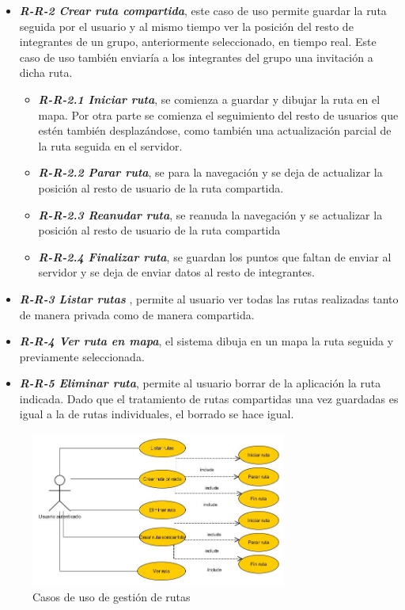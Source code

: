 \begin{itemize}
\begin{itemize}
\item \textbf{\textit{R-R-2 Crear ruta compartida}}, este caso de uso permite guardar la ruta seguida por el usuario y al mismo tiempo ver la posición del resto de integrantes de un grupo, anteriormente seleccionado, en tiempo real. Este caso de uso también enviaría a los integrantes del grupo una invitación a dicha ruta.
\begin{itemize}
\item \textbf{\textit{R-R-2.1 Iniciar ruta}}, se comienza a guardar y dibujar la ruta en el mapa. Por otra parte se comienza el seguimiento del resto de usuarios que estén también desplazándose, como también una actualización parcial de la ruta seguida en el servidor.
\item \textbf{\textit{R-R-2.2 Parar ruta}}, se para la navegación y se deja de actualizar la posición al resto de usuario de la ruta compartida.
\item \textbf{\textit{R-R-2.3 Reanudar ruta}}, se reanuda la navegación y se  actualizar la posición al resto de usuario de la ruta compartida
\item \textbf{\textit{R-R-2.4 Finalizar ruta}}, se guardan los puntos que faltan de enviar al servidor y se deja de enviar datos al resto de integrantes.
\end{itemize}
\item \textbf{\textit{R-R-3 Listar rutas} }, permite al usuario ver todas las rutas realizadas tanto de manera privada como de manera compartida.
\item \textbf{\textit{R-R-4 Ver ruta en mapa}}, el sistema dibuja en un mapa la ruta seguida y previamente seleccionada.
\item \textbf{\textit{R-R-5 Eliminar ruta}}, permite al usuario borrar de la aplicación la ruta indicada. Dado que el tratamiento de rutas compartidas una vez guardadas es igual a la de rutas individuales, el borrado se hace igual.

\end{itemize} 
\end{itemize}
\begin{figure}
		\centering
		\includegraphics[width=0.75\textwidth] {rutas.jpg}
		\caption{Casos de uso de gestión de rutas }
		\label{fig:rutas}
	\end{figure}


